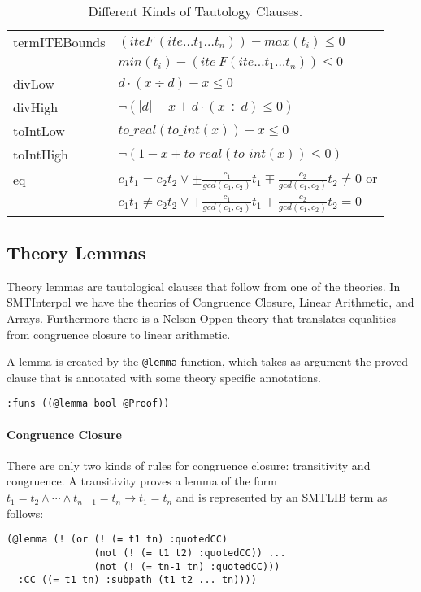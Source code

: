 \documentclass[a4paper]{article}
\newcommand\si{SMTInterpol\xspace}
\begin{document}
\begin{table}[htbp]
\begin{tabular}{l|l}
    termITEBounds & $(ite F\ (ite \dots t_1 \dots t_n)) - max(t_i) \leq 0$\\
     & $min(t_i) -(ite\ F (ite \dots t_1 \dots t_n)) \leq 0$\\
    divLow & $d\cdot (x\div d) - x \leq 0$\\
    divHigh & $\neg (|d| - x + d\cdot (x\div d)\leq 0)$\\
    toIntLow & $to\_real(to\_int(x)) - x \leq 0$\\
    toIntHigh & $\neg (1 - x + to\_real(to\_int(x))\leq 0)$\\
    eq & $c_1t_1=c_2t_2\lor
    \pm\frac{c_1}{gcd(c_1,c_2)}t_1\mp\frac{c_2}{gcd(c_1,c_2)}t_2\neq 0$ or\\
    &$c_1t_1\neq c_2t_2\lor \pm\frac{c_1}{gcd(c_1,c_2)}t_1\mp\frac{c_2}{gcd(c_1,c_2)}t_2=0$
  \end{tabular}
  \caption{\label{tab:tautforms}Different Kinds of Tautology Clauses.}
\end{table}

\subsection{Theory Lemmas}
Theory lemmas are tautological clauses that follow from one of the
theories.  In \si we have the theories of Congruence Closure, Linear
Arithmetic, and Arrays.  Furthermore there is a Nelson-Oppen theory
that translates equalities from congruence closure to linear
arithmetic.

A lemma is created by the \verb+@lemma+ function, which takes as
argument the proved clause that is annotated with some theory specific
annotations.
\begin{verbatim}
:funs ((@lemma bool @Proof))
\end{verbatim}

\paragraph{Congruence Closure}

There are only two kinds of rules for congruence closure: transitivity
and congruence.  A transitivity proves a lemma of the form ${t_1 = t_2}
\land \cdots\land {t_{n-1}= t_n} \rightarrow {t_1 = t_n}$ and is
represented by an SMTLIB term as follows:

\begin{verbatim}
(@lemma (! (or (! (= t1 tn) :quotedCC)
               (not (! (= t1 t2) :quotedCC)) ...
               (not (! (= tn-1 tn) :quotedCC)))
  :CC ((= t1 tn) :subpath (t1 t2 ... tn))))
\end{verbatim}
\end{document}
